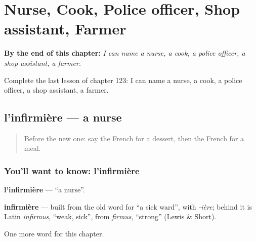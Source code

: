 
\chapter{Nurse, Cook, Police officer, Shop assistant, Farmer}
\label{ch:fr-nurse-cook-police-officer-shop-assistant-farmer}

\begin{chapteropening}
\textbf{By the end of this chapter:} \emph{I can name a nurse, a cook, a police officer, a shop assistant, a farmer.}

Complete the last lesson of chapter 123: I can name a nurse, a cook, a police officer, a shop assistant, a farmer.
\end{chapteropening}

\section[l'infirmière]{l'infirmière — a nurse}

\label{lesson:FR-C123-infirmiere}



\begin{quote}
Before the new one: say the French for a dessert, then the French for a meal.
\end{quote}

\subsection*{You'll want to know: l'infirmière}
\textbf{l'infirmière} — \textquotedblleft{}a nurse\textquotedblright{}.

\begin{cousinweb}
\textbf{infirmière} — built from the old word for \textquotedblleft{}a sick ward\textquotedblright{}, with \emph{-ière}; behind it is Latin \emph{infirmus}, \textquotedblleft{}weak, sick\textquotedblright{}, from \emph{firmus}, \textquotedblleft{}strong\textquotedblright{} (Lewis \& Short).
\end{cousinweb}

\begin{grammarlens}[title={What you've built}]
One more word for this chapter.
\end{grammarlens}

